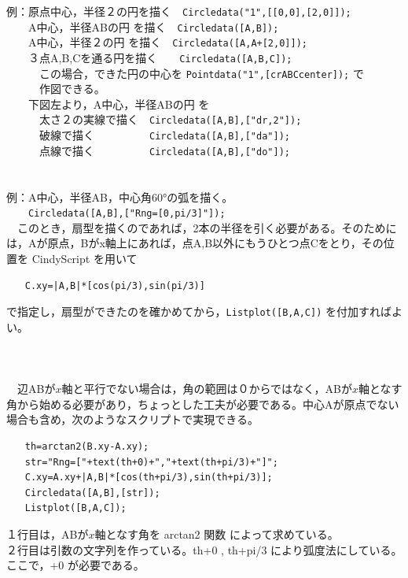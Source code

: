 \documentclass[papersize,a4paper,12pt,uplatex]{jsarticle}
\begin{document}
\begin{description}
\begin{tabbing}
\end{tabbing}
例：原点中心，半径２の円を描く　\verb|Circledata("1",[[0,0],[2,0]]);|\\
　　A中心，半径ABの円 を描く　\verb|Circledata([A,B]);|\\
　　A中心，半径２の円 を描く　\verb|Circledata([A,A+[2,0]]);|\\
　　３点A,B,Cを通る円を描く　　\verb|Circledata([A,B,C]);|\\
　　　この場合，できた円の中心を \verb|Pointdata("1",[crABCcenter]);| で\\
　　　作図できる。\\
　　下図左より，A中心，半径ABの円 を\\
　　　太さ２の実線で描く　\verb|Circledata([A,B],["dr,2"]);|\\
　　　破線で描く　　　　　\verb|Circledata([A,B],["da"]);|\\
　　　点線で描く　　　　　\verb|Circledata([A,B],["do"]);|\\
　\\

　\\
例：A中心，半径AB，中心角60°の弧を描く。\\
　　\verb|Circledata([A,B],["Rng=[0,pi/3]"]); |\\
　このとき，扇型を描くのであれば，2本の半径を引く必要がある。そのためには，Aが原点，Bがx軸上にあれば，点A,B以外にもうひとつ点Cをとり，その位置を CindyScript を用いて
\begin{verbatim}
　　C.xy=|A,B|*[cos(pi/3),sin(pi/3)]
\end{verbatim}
 で指定し，扇型ができたのを確かめてから，\verb|Listplot([B,A,C])| を付加すればよい。\\
\\
　　　　　　　\\
\\
　辺ABが$x$軸と平行でない場合は，角の範囲は０からではなく，ABが$x$軸となす角から始める必要があり，ちょっとした工夫が必要である。中心Aが原点でない場合も含め，次のようなスクリプトで実現できる。\begin{verbatim}
　　th=arctan2(B.xy-A.xy);
　　str="Rng=["+text(th+0)+","+text(th+pi/3)+"]";
　　C.xy=A.xy+|A,B|*[cos(th+pi/3),sin(th+pi/3)]; 
　　Circledata([A,B],[str]);
　　Listplot([B,A,C]);
\end{verbatim}
１行目は，ABが$x$軸となす角を arctan2 関数 によって求めている。\\
２行目は引数の文字列を作っている。th+0 , th+pi/3 により弧度法にしている。ここで，+0 が必要である。\\
\\
　　　　　　　\\
\\


\end{description}
\end{document}
